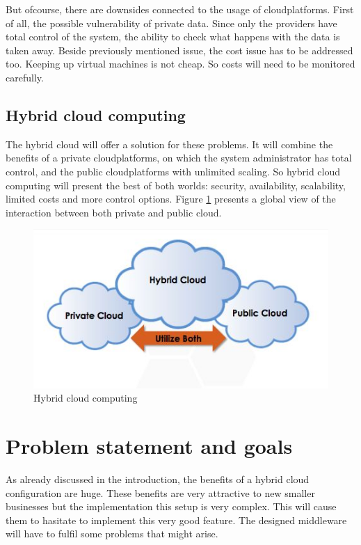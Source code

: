 \documentclass[journal]{IEEEtran}
\begin{document}
But ofcourse, there are downsides connected to the usage of cloudplatforms.
First of all, the possible vulnerability of private data.
Since only the providers have total control of the system, the ability to check what happens with the data is taken away.
Beside previously mentioned issue, the cost issue has to be addressed too.
Keeping up virtual machines is not cheap.
So costs will need to be monitored carefully.

\subsection{Hybrid cloud computing}
The hybrid cloud will offer a solution for these problems.
It will combine the benefits of a private cloudplatforms, on which the system administrator has total control, and the public cloudplatforms with unlimited scaling.
So hybrid cloud computing will present the best of both worlds: security, availability, scalability, limited costs and more control options.
Figure \ref{fig:hybridcloud} presents a global view of the interaction between both private and public cloud.


\begin{figure}[h!]
    \centering
    \includegraphics[width=\linewidth]{images/cloud_v_hybrid.jpg}
    \caption{Hybrid cloud computing\cite{IEEEhowto:kopka}}
    \label{fig:hybridcloud}
\end{figure}

\section{Problem statement and goals}\label{problems}
As already discussed in the introduction, the benefits of a hybrid cloud configuration are huge.
These benefits are very attractive to new smaller businesses but the implementation this setup is very complex.
This will cause them to hasitate to implement this very good feature.
The designed middleware will have to fulfil some problems that might arise.\newline
\end{document}
